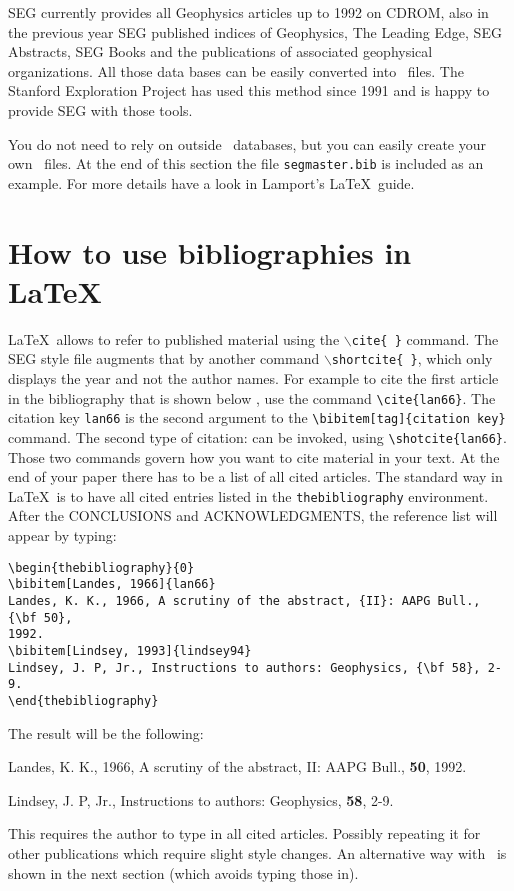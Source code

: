SEG currently provides all Geophysics articles up to 1992 on CDROM,
also in the previous year SEG published indices of Geophysics, 
The Leading Edge, SEG Abstracts, SEG Books and the 
publications of associated geophysical organizations.
All those data bases can be easily converted into
\BibTeX\  files. The Stanford Exploration Project has used this method
since 1991 and is happy to provide SEG with those tools.

You do not need to rely on outside \BibTeX\  databases, but you can 
easily create your own \BibTeX\  files. At the end of this section
the file {\tt segmaster.bib} is included as an example.
For more details have a look in Lamport's \LaTeX\ guide. \cite{lamport}

\section{How to use bibliographies in \LaTeX\  }
\LaTeX\  allows to refer to published material using the 
{\tt $\backslash$cite\{ \}} command. The SEG style file augments that
by another command {\tt $\backslash$shortcite\{ \}}, 
which only displays the year and not the author names.
For example to cite the first article in the bibliography that is shown below
\cite{lan66}, use the command \verb+\cite{lan66}+. The citation key {\tt lan66}
is the second argument to the \verb+\bibitem[tag]{citation key}+ command.
The second type of citation:  can be invoked, using
\verb+\shotcite{lan66}+.
Those two commands govern how you want to cite material in your text.
At the end of your paper there has to be a list of all cited articles.
The standard way in \LaTeX\ is to have all cited entries listed in
the {\tt thebibliography} environment.
After the CONCLUSIONS and ACKNOWLEDGMENTS, the reference list will appear
by typing:

{\tighten
\begin{verbatim}
\begin{thebibliography}{0}
\bibitem[Landes, 1966]{lan66}
Landes, K. K., 1966, A scrutiny of the abstract, {II}: AAPG Bull., {\bf 50}, 
1992.
\bibitem[Lindsey, 1993]{lindsey94}
Lindsey, J. P, Jr., Instructions to authors: Geophysics, {\bf 58}, 2-9.
\end{thebibliography}
\end{verbatim}
}

The result will be the following:
{\tighten
\begin{thebibliography}{0}
Landes, K. K., 1966, A scrutiny of the abstract, {II}: AAPG Bull., {\bf 50}, 
1992.

Lindsey, J. P, Jr., Instructions to authors: Geophysics, {\bf 58}, 2-9.

\end{thebibliography}
}
This requires the author to type in all cited articles. Possibly repeating
it for other publications which require slight style changes. 
An alternative way with \BibTeX\  is shown in the next section 
(which avoids typing those in).


